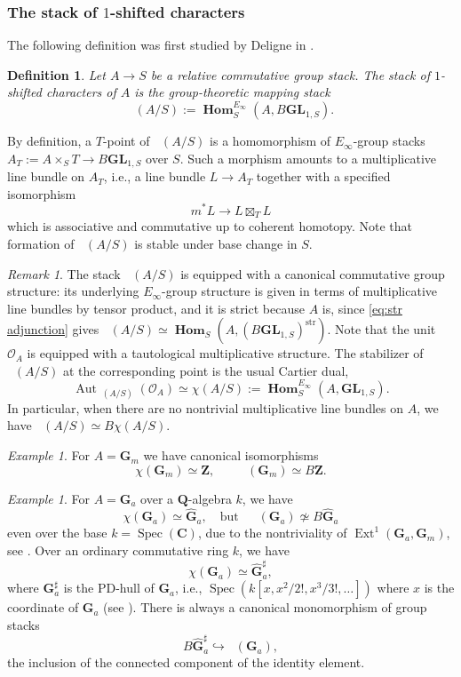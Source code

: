 \documentclass[12pt, oneside]{amsart}
\numberwithin{equation}{section}
\newtheorem{definition}[subsubsection]{Definition}
\theoremstyle{remark}
\newtheorem{remark}[subsubsection]{Remark}
\newtheorem{example}[subsubsection]{Example}
\theoremstyle{plain}
\DeclareMathOperator{\HOM}{\mathbf{Hom}}
\DeclareMathOperator{\CharOne}{\chi^{(1)}}
\DeclareMathOperator{\spc}{Spec}
\newcommand{\GGhat}{\widehat{\mathbf{G}}}
\newcommand{\GGa}{\mathbf{G}_{a}}
\newcommand{\GGm}{\mathbf{G}_{m}}
\newcommand{\GM}{\mathbf{G}_{m}}
\newcommand{\GL}{\mathbf{GL}}
\newcommand{\bQ}{\mathbf{Q}}
\begin{document}
\subsubsection{The stack of $1$-shifted characters}\label{sssec:CharOne}

The following definition was first studied by Deligne in \cite{Deligne}.

\begin{definition}
  Let $A \to S$ be a relative commutative group stack.
  The \emph{stack of $1$-shifted characters} of $A$ is the group-theoretic mapping stack
  \[ \CharOne(A/S) := \HOM_S^{E_\infty}(A, B\GL_{1,S}). \]
\end{definition}

By definition, a $T$-point of $\CharOne(A/S)$ is a homomorphism of $E_\infty$-group stacks $A_T := A \times_S T \to B\GL_{1,S}$ over $S$.
Such a morphism amounts to a multiplicative line bundle on $A_T$, i.e., a line bundle $L \to A_T$ together with a specified isomorphism $$m^{*}L\rightarrow L\boxtimes_{T} L$$ which is associative and commutative up to coherent homotopy. Note that formation of $\CharOne(A/S)$ is stable under base change in $S$.

\begin{remark} The stack $\CharOne(A/S)$ is equipped with a canonical commutative group structure: its underlying $E_\infty$-group structure is given in terms of multiplicative line bundles by tensor product, and it is strict because $A$ is, since \eqref{eq:str adjunction} gives $\CharOne(A/S) \simeq \HOM_S(A, (B\GL_{1,S})^{\mathrm{str}})$. Note that the unit $\mathcal{O}_A$ is equipped with a tautological multiplicative structure. The stabilizer of $\CharOne(A/S)$ at the corresponding point is the usual Cartier dual,
$$\operatorname{Aut}_{\CharOne(A/S)}(\mathcal{O}_A) \simeq \chi(A/S) := \HOM_S^{E_\infty}(A, \GL_{1,S}).$$
In particular, when there are no nontrivial multiplicative line bundles on $A$, we have $\CharOne(A/S)\simeq B\chi(A/S).$ \end{remark}

\begin{example} For $A=\GGm$ we have canonical isomorphisms
\[
  \chi(\GGm) \simeq \mathbf{Z},
  \qquad \CharOne(\GGm) \simeq B\mathbf{Z}.
\]
\end{example}

\begin{example}
For $A=\GGa$ over a $\bQ$-algebra $k$, we have
$$ \chi(\GGa) \simeq \GGhat_{a}, \quad\textrm{but}\quad \CharOne(\GGa) \not\simeq B\GGhat_{a}$$ even over the base $k=\spc(\mathbf{C})$, due to the nontriviality of $\operatorname{Ext}^1(\GGa, \GM)$, see \cite{RibeiroRosengarten}. Over an ordinary commutative ring $k$, we have
\[ \chi(\GGa) \simeq \GGhat_{a}^\sharp, \]
where $\GGa^\sharp$ is the PD-hull of $\GGa$, i.e., $\spc(k[x, x^2/2!, x^3/3!, \ldots])$ where $x$ is the coordinate of $\GGa$ (see \cite[\S 2.4]{BhattFGauges}). There is always a canonical monomorphism of group stacks
$$ B \GGhat_a^\sharp \hookrightarrow \CharOne(\GGa), $$
the inclusion of the connected component of the identity element.
\end{example}
\end{document}
